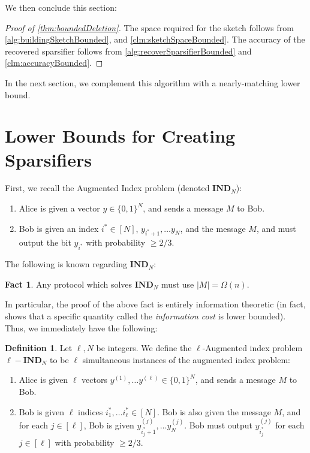 \documentclass[11pt]{article}
\theoremstyle{definition}
\newtheorem{definition}[theorem]{Definition}
\newtheorem{fact}[theorem]{Fact}
\newcommand{\zo}{\{0, 1\}}
\begin{document}
We then conclude this section:

\begin{proof}[Proof of \cref{thm:boundedDeletion}]
	The space required for the sketch follows from \cref{alg:buildingSketchBounded}, and \cref{clm:sketchSpaceBounded}. The accuracy of the recovered sparsifier follows from \cref{alg:recoverSparsifierBounded} and \cref{clm:accuracyBounded}.
\end{proof}

In the next section, we complement this algorithm with a nearly-matching lower bound.

\section{Lower Bounds for Creating Sparsifiers}\label{sec:lowerbound}

First, we recall the Augmented Index problem (denoted $\textbf{IND}_N$):

\begin{enumerate}
    \item Alice is given a vector $y \in \zo^N$, and sends a message $M$ to Bob.
    \item Bob is given an index $i^* \in [N]$, $y_{i^* + 1}, \dots y_N$, and the message $M$, and must output the bit $y_{i^*}$ with probability $\geq 2/3$. 
\end{enumerate}

The following is known regarding $\textbf{IND}_N$:

\begin{fact}\cite{CK11}
    Any protocol which solves $\textbf{IND}_N$ must use $|M| = \Omega(n)$.
\end{fact}

In particular, the proof of the above fact is entirely information theoretic (in fact, \cite{CK11} shows that a specific quantity called the \emph{information cost} is lower bounded). Thus, we immediately have the following: 

\begin{definition}
    Let $\ell, N$ be integers. We define the $\ell$-Augmented index problem $\ell-\textbf{IND}_N$ to be $\ell$ simultaneous instances of the augmented index problem:
    \begin{enumerate}
        \item Alice is given $\ell$ vectors $y^{(1)}, \dots y^{(\ell)} \in \zo^N$, and sends a message $M$ to Bob.
    \item Bob is given $\ell$ indices $i_1^*, \dots i_{\ell}^* \in [N]$. Bob is also given the message $M$, and for each $j \in [\ell]$, Bob is given $y^{(j)}_{i_j^* + 1}, \dots y^{(j)}_N$. Bob must output $y^{(j)}_{i_{j}^*}$ for each $j \in [\ell]$ with probability $\geq 2/3$. 
    \end{enumerate}
\end{definition}
\end{document}
